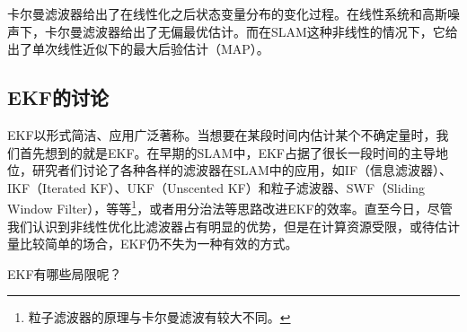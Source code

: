 卡尔曼滤波器给出了在线性化之后状态变量分布的变化过程。在线性系统和高斯噪声下，卡尔曼滤波器给出了无偏最优估计。而在SLAM这种非线性的情况下，它给出了单次线性近似下的最大后验估计（MAP）。

\subsection{EKF的讨论}
EKF以形式简洁、应用广泛著称。当想要在某段时间内估计某个不确定量时，我们首先想到的就是EKF。在早期的SLAM中，EKF占据了很长一段时间的主导地位，研究者们讨论了各种各样的滤波器在SLAM中的应用，如IF（信息滤波器）\textsuperscript{\cite{Sujan2005}}、IKF\textsuperscript{\cite{Janabi-Sharifi2010}}（Iterated KF）、UKF\textsuperscript{\cite{Li2010}}（Unscented KF）和粒子滤波器\textsuperscript{\cite{Sim2007, Lee2011, Gil2010a}}、SWF（Sliding Window \mbox{Filter）\textsuperscript{\cite{Sibley2010}}}，等等\textsuperscript{\cite{Chen2012}}\footnote{粒子滤波器的原理与卡尔曼滤波有较大不同。}，或者用分治法等思路改进EKF的效率\textsuperscript{\cite{Paz2008, Grasa2011}}。直至今日，尽管我们认识到非线性优化比滤波器占有明显的优势，但是在计算资源受限，或待估计量比较简单的场合，EKF仍不失为一种有效的方式。

EKF有哪些局限呢？

